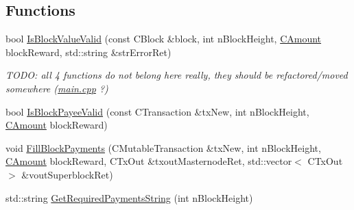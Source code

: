\subsection*{Functions}
\begin{DoxyCompactItemize}
\item 
bool \mbox{\hyperlink{masternode-payments_8h_ab5c4de235616a5c435b32167d76f1efe}{Is\+Block\+Value\+Valid}} (const C\+Block \&block, int n\+Block\+Height, \mbox{\hyperlink{amount_8h_a4eaf3a5239714d8c45b851527f7cb564}{C\+Amount}} block\+Reward, std\+::string \&str\+Error\+Ret)
\begin{DoxyCompactList}\small\item\em T\+O\+DO\+: all 4 functions do not belong here really, they should be refactored/moved somewhere (\mbox{\hyperlink{main_8cpp}{main.\+cpp}} ?) \end{DoxyCompactList}\item 
bool \mbox{\hyperlink{masternode-payments_8h_a26df8e859f425afc3af5448f582c8dd5}{Is\+Block\+Payee\+Valid}} (const C\+Transaction \&tx\+New, int n\+Block\+Height, \mbox{\hyperlink{amount_8h_a4eaf3a5239714d8c45b851527f7cb564}{C\+Amount}} block\+Reward)
\item 
void \mbox{\hyperlink{masternode-payments_8h_a1a60010ef73db581ad54a165770391c6}{Fill\+Block\+Payments}} (C\+Mutable\+Transaction \&tx\+New, int n\+Block\+Height, \mbox{\hyperlink{amount_8h_a4eaf3a5239714d8c45b851527f7cb564}{C\+Amount}} block\+Reward, C\+Tx\+Out \&txout\+Masternode\+Ret, std\+::vector$<$ C\+Tx\+Out $>$ \&vout\+Superblock\+Ret)
\item 
std\+::string \mbox{\hyperlink{masternode-payments_8h_a7828ab0b9a1302db35b658f727b260e1}{Get\+Required\+Payments\+String}} (int n\+Block\+Height)
\end{DoxyCompactItemize}
